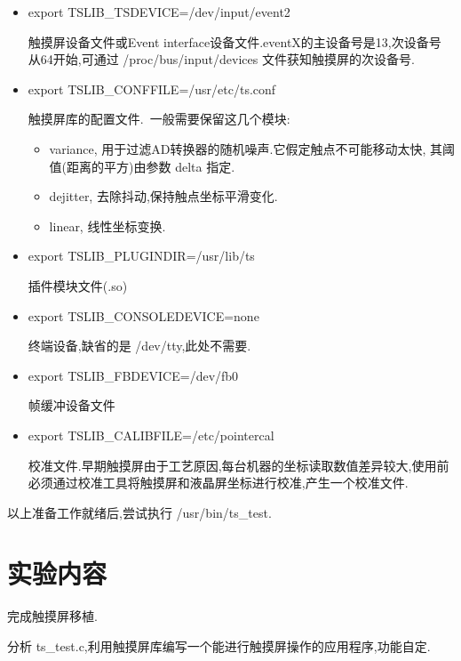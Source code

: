 \begin{itemize}\itemsep=-4pt
  \item export TSLIB\_TSDEVICE=/dev/input/event2

	触摸屏设备文件或Event interface设备文件.eventX的主设备号是13,次设备号
从64开始,可通过 /proc/bus/input/devices 文件获知触摸屏的次设备号.
  \item export TSLIB\_CONFFILE=/usr/etc/ts.conf         

	触摸屏库的配置文件.~一般需要保留这几个模块:
  \begin{itemize}
    \item variance, 用于过滤AD转换器的随机噪声.它假定触点不可能移动太快,
	其阈值(距离的平方)由参数 delta 指定.
    \item dejitter, 去除抖动,保持触点坐标平滑变化.
    \item linear, 线性坐标变换.
  \end{itemize}
  \item export TSLIB\_PLUGINDIR=/usr/lib/ts

	插件模块文件(.so)
  \item export TSLIB\_CONSOLEDEVICE=none

	终端设备,缺省的是 /dev/tty,此处不需要.
  \item export TSLIB\_FBDEVICE=/dev/fb0

	帧缓冲设备文件
  \item export TSLIB\_CALIBFILE=/etc/pointercal

	校准文件.早期触摸屏由于工艺原因,每台机器的坐标读取数值差异较大,使用前
必须通过校准工具将触摸屏和液晶屏坐标进行校准,产生一个校准文件.
\end{itemize}

	以上准备工作就绪后,尝试执行 /usr/bin/ts\_test.

\section{实验内容}
	完成触摸屏移植.

	分析 ts\_test.c,利用触摸屏库编写一个能进行触摸屏操作的应用程序,功能自定.
